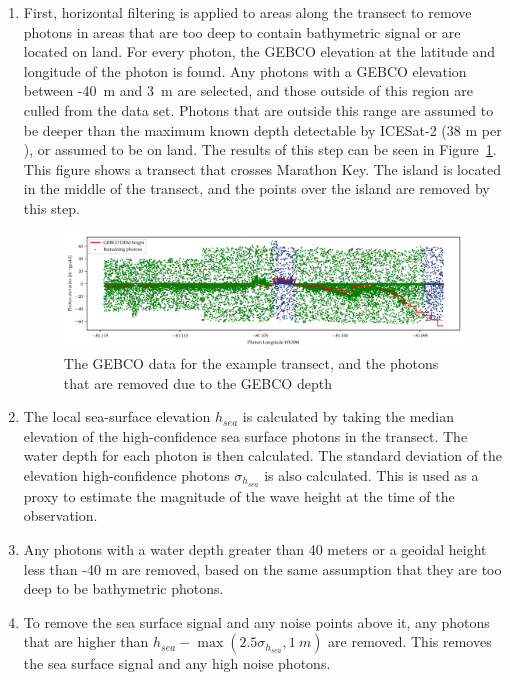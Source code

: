 \begin{enumerate}
    \item First, horizontal filtering is applied to areas along the transect to remove photons in areas that are too deep to contain bathymetric signal or are located on land. For every photon, the GEBCO elevation at the latitude and longitude of the photon is found. Any photons with a GEBCO elevation between -40~m and 3~m are selected, and those outside of this region are culled from the data set. Photons that are outside this range are assumed to be deeper than the maximum known depth detectable by ICESat-2 (38 m per \citeauthor{Parrish2019}), or assumed to be on land. The results of this step can be seen in Figure~\ref{fig:gebco_filtering}. This figure shows a transect that crosses Marathon Key. The island is located in the middle of the transect, and the points over the island are removed by this step.
    
    \begin{figure}[htbp]
        \centering
        \includegraphics[width=\textwidth]{figures/methodology_gebco_filtering.pdf}
        \caption{The GEBCO data for the example transect, and the photons that are removed due to the GEBCO depth}
        \label{fig:gebco_filtering}
    \end{figure}

    \item The local sea-surface elevation $h_{sea}$ is calculated by taking the median elevation of the  high-confidence sea surface photons in the transect. The water depth for each photon is then calculated. The standard deviation of the elevation high-confidence photons $\sigma_{h_{sea}}$ is also calculated. This is used as a proxy to estimate the magnitude of the wave height at the time of the observation.
    \item Any photons with a water depth greater than 40 meters or a geoidal height less than -40 m are removed, based on the same assumption that they are too deep to be bathymetric photons. 
    \item To remove the sea surface signal and any noise points above it, any photons that are higher than $h_{sea} - \max{(2.5\sigma_{h_{sea}},1~m)}$ are removed. This removes the sea surface signal and any high noise photons.
    

\end{enumerate}
